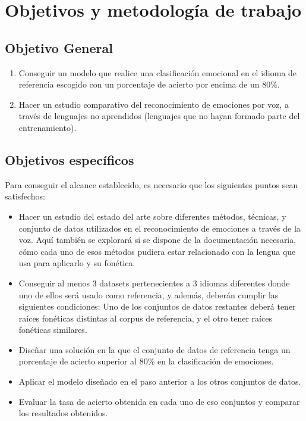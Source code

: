 \documentclass[11pt,a4paper,spanish]{book}
\begin{document}
	
	\chapter{Objetivos y metodología de trabajo}
		
	\section{Objetivo General}
	
	\begin{enumerate}
		\item Conseguir un modelo que realice una clasificación emocional en el idioma de referencia escogido con un porcentaje de acierto por encima de un 80\%.
		\item Hacer un estudio comparativo del reconocimiento de emociones por voz, a través de lenguajes no aprendidos (lenguajes que no hayan formado parte del entrenamiento).
	\end{enumerate} 

	\section{Objetivos específicos}
	Para conseguir el alcance establecido, es necesario que los siguientes puntos sean satisfechos:
	\begin{itemize}
		\item Hacer un estudio del estado del arte sobre diferentes métodos, técnicas, y conjunto de datos utilizados en el reconocimiento de emociones a través de la voz. Aquí también se explorará si se dispone de la documentación necesaria, cómo cada uno de esos métodos pudiera estar relacionado con la lengua que usa para aplicarlo y su fonética.
		
		\item  Conseguir al menos 3 datasets pertenecientes a 3 idiomas diferentes donde uno de ellos será usado como referencia, y además, deberán cumplir las siguientes condiciones: Uno de los conjuntos de datos restantes deberá tener raíces fonéticas distintas al corpus de referencia, y el otro tener raíces fonéticas similares.
		
		\item Diseñar una solución en la que el conjunto de datos de referencia tenga un porcentaje de acierto superior al 80\% en la clasificación de emociones.
		
		\item Aplicar el modelo diseñado en el paso anterior a los otros conjuntos de datos.
		
		\item Evaluar la tasa de acierto obtenida en cada uno de eso conjuntos y comparar los resultados obtenidos.
		
	\end{itemize}
\end{document}
